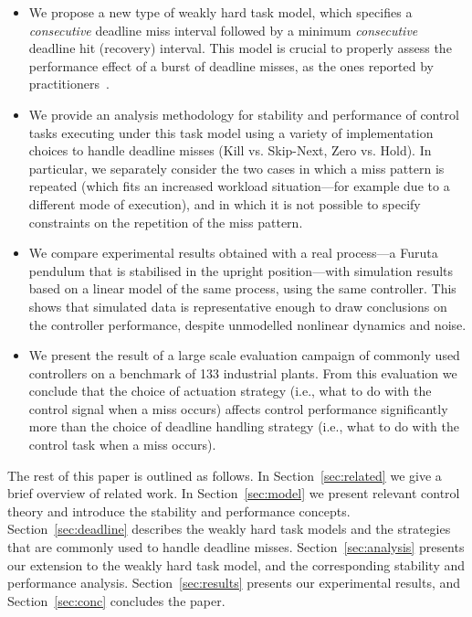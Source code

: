 \begin{itemize}
\item We propose a new type of weakly hard task model, which
specifies a \emph{consecutive} deadline miss interval followed by
a minimum \emph{consecutive} deadline hit (recovery) interval. This model
is crucial to properly assess the performance effect of a burst of
deadline misses, as the ones reported by
practitioners~\cite{Akesson:2020}.

\item We provide an analysis methodology for stability and performance of
control tasks executing under this task model using a variety of
implementation choices to handle deadline misses (Kill vs. Skip-Next,
Zero vs. Hold). In particular, we separately consider the two cases in
which a miss pattern is repeated (which fits an increased workload
situation---for example due to a different mode of execution), and in
which it is not possible to specify constraints on the repetition of
the miss pattern.

\item We compare experimental results obtained with a real process---a Furuta pendulum that is stabilised in the upright position---with simulation results based on a linear model of the same process, using the same controller. 
This shows that simulated data is representative enough to draw conclusions on the controller performance, despite unmodelled nonlinear dynamics and noise.

\item We present the result of a large scale evaluation campaign of commonly used controllers on a benchmark of 133 industrial plants. From this evaluation we conclude that the choice of actuation strategy (i.e., what to do with the control signal when a miss occurs) affects control performance significantly more than the choice of deadline handling strategy (i.e., what to do with the control task when a miss occurs).

\end{itemize}

The rest of this paper is outlined as follows. In
Section~\ref{sec:related} we give a brief overview of related work. In
Section~\ref{sec:model} we present relevant control theory and
introduce the stability and performance concepts.
Section~\ref{sec:deadline} describes the weakly hard task models and
the strategies that are commonly used to handle deadline
misses. Section~\ref{sec:analysis} presents our extension to the weakly
hard task model, and the corresponding stability and
performance analysis. Section~\ref{sec:results} presents our experimental results, and
Section~\ref{sec:conc} concludes the paper.
